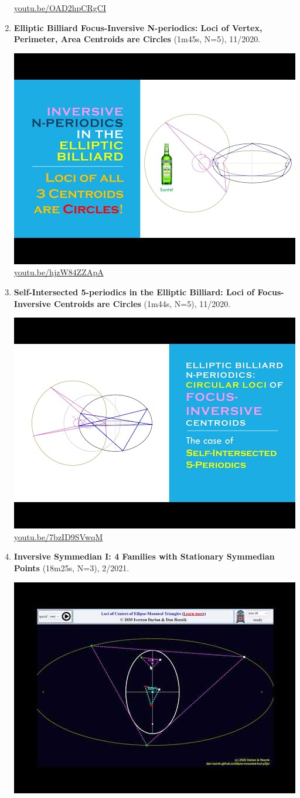 \documentclass[12pt]{amsart}
\begin{document}
\begin{enumerate}[resume]
\begin{center}
\href{https://youtu.be/OAD2hpCRgCI}{\url{youtu.be/OAD2hpCRgCI}}\end{center}
% 
\item \textbf{Elliptic Billiard Focus-Inversive N-periodics: Loci of Vertex, Perimeter, Area Centroids are Circles} (1m45s, N=5), 11/2020. 
\begin{center}\includegraphics[width=.5\textwidth]{pics/hjzW84ZZApA.jpg} \\ 
\href{https://youtu.be/hjzW84ZZApA}{\url{youtu.be/hjzW84ZZApA}}\end{center}
% 
\item \textbf{Self-Intersected 5-periodics in the Elliptic Billiard: Loci of Focus-Inversive Centroids are Circles} (1m44s, N=5), 11/2020. 
\begin{center}\includegraphics[width=.5\textwidth]{pics/7bzID9SVwqM.jpg} \\ 
\href{https://youtu.be/7bzID9SVwqM}{\url{youtu.be/7bzID9SVwqM}}\end{center}
% 
\item \textbf{Inversive Symmedian I: 4 Families with Stationary Symmedian Points} (18m25s, N=3), 2/2021. 
\begin{center}\includegraphics[width=.5\textwidth]{pics/F0YuAx2Dy6M.jpg} \\ 

\end{center}
\end{enumerate}
\end{document}

